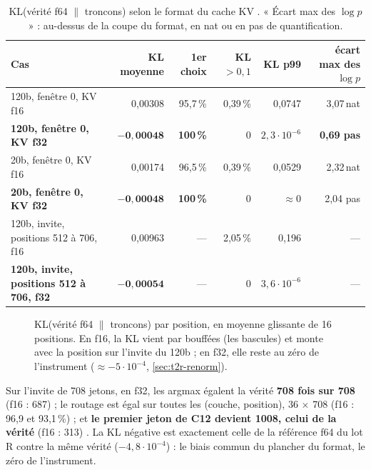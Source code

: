 \begin{table}[ht]
\centering\small
\caption[Le cache KV en f16 contre f32, contre la vérité f64]{KL(vérité f64 $\|$ troncons) selon le format du cache KV \mes. « Écart max des $\log p$ » : au-dessus de la coupe du format, en nat ou en pas de quantification.}
\label{tab:t2r-kv}
\setlength{\tabcolsep}{4pt}
\begin{tabular}{@{}lrrrrr@{}}
\toprule
Cas & KL moyenne & 1er choix & KL $> 0{,}1$ & KL p99 & écart max des $\log p$ \\
\midrule
120b, fenêtre 0, KV f16 & 0,00308 & 95,7\,\% & 0,39\,\% & 0,0747 & 3,07\,nat \\
\textbf{120b, fenêtre 0, KV f32} & $\mathbf{-0{,}00048}$ & \textbf{100\,\%} & 0 & $2{,}3\cdot10^{-6}$ & \textbf{0,69 pas} \\
20b, fenêtre 0, KV f16 & 0,00174 & 96,5\,\% & 0,39\,\% & 0,0529 & 2,32\,nat \\
\textbf{20b, fenêtre 0, KV f32} & $\mathbf{-0{,}00048}$ & \textbf{100\,\%} & 0 & $\approx 0$ & 2,04 pas \\
120b, invite, positions 512 à 706, f16 & 0,00963 & --- & 2,05\,\% & 0,196 & --- \\
\textbf{120b, invite, positions 512 à 706, f32} & $\mathbf{-0{,}00054}$ & --- & 0 & $3{,}6\cdot10^{-6}$ & --- \\
\bottomrule
\end{tabular}
\end{table}

\begin{figure}[ht]
\centering
\GrapheRefKv
\caption[KL contre la vérité, cache KV f16 contre f32]{KL(vérité f64 $\|$ troncons) par position, en moyenne glissante de 16 positions. En f16, la KL vient par bouffées (les bascules) et monte avec la position sur l'invite du 120b ; en f32, elle reste au zéro de l'instrument ($\approx -5\cdot10^{-4}$, \cref{sec:t2r-renorm}).}
\label{fig:t2r-kv}
\end{figure}

Sur l'invite de 708 jetons, en f32, les argmax égalent la vérité \textbf{708 fois sur 708} (f16 : 687) ; le routage est égal sur toutes les (couche, position), 36 $\times$ 708 (f16 : 96,9 et 93,1\,\%) ; et \textbf{le premier jeton de C12 devient 1008, celui de la vérité} (f16 : 313) \mes. La KL négative est exactement celle de la référence f64 du lot R contre la même vérité ($-4{,}8\cdot10^{-4}$) : le biais commun du plancher du format, le zéro de l'instrument.


